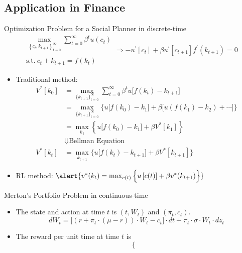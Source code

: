 \documentclass[UTF8, 10pt]{beamer}
\begin{document}
\begin{CJK*}{UTF8}{gbsn}
\section{Application in Finance}
\begin{frame}{Optimization Problem for a Social Planner in discrete-time}
	\vspace{-0.3cm}
	$$
	\begin{array}{c}
	\max_{\left\{c_{t}, k_{t+1}\right\}_{t=0}^{\infty}} \sum_{t=0}^{\infty} \beta^{t} u\left(c_{t}\right) \\\ \\ \text{s.t.}\ {c_{t}}+{k_{t+1}}=f(k_{t})	
	\end{array}
	\Rightarrow
	-u^{\prime}\left[c_{t}\right]+\beta u^{\prime}\left[c_{t+1}\right] f^{\prime}\left(k_{t+1}\right)=0
	$$
	\begin{itemize}
		\item Traditional method:
		$$
		\begin{aligned}
		V^{*}[k_{0}]
		&=\max_{\{k_{t+1}\}_{t=0}^\infty} \sum_{t=0}^{\infty} \beta^{t} u\Big[f\left(k_{t}\right)-k_{t+1}\Big]
		\\
		&=\max_{\{k_{t+1}\}_{t=0}^\infty}\Big\{u\Big[f\left(k_{0}\right)-k_{1}\Big]+\beta\Big[u\left(f\left(k_{1}\right)-k_{2}\right)+\cdots\Big]\Big\}
		\\
		&=\max _{k_{1}}\left\{u\Big[f\left(k_{0}\right)-k_{1}\Big]+\beta V^{*}\left[k_{1}\right]\right\}
		\\&\Downarrow \text{Bellman Equation}\\
		V^{*}\left[k_{t}\right]&=\max _{k_{t+1}}\Big\{u\Big[f\left(k_{t}\right)-k_{t+1}\Big]+\beta V^{*}\left[k_{t+1}\right]\Big\}
		\end{aligned} 
		$$
		\item RL method:
		$\alert{
		v^*(k_t) = \max_{c(t)}\Big\{u\left[c(t)\right]+\beta v^*(k_{t+1})\Big\}
		}
		$
	\end{itemize}
\end{frame}
\begin{frame}{Merton's Portfolio Problem in continuous-time}
	\begin{itemize}
		\item The state and action at time $t$ is $(t, W_t)$ and $(\pi_t, c_t)$.
			$$
			d W_{t}=\Big[\left(r+\pi_{t} \cdot(\mu-r)\right) \cdot W_{t}-c_{t}\Big] \cdot d t+\pi_{t} \cdot \sigma \cdot W_{t} \cdot d z_{t}
			$$
		\item The reward per unit time at time $t$ is
			$$
			\left\{
			\begin{array}{l}

\end{array}$$
\end{itemize}
\end{frame}
\end{CJK*}
\end{document}
